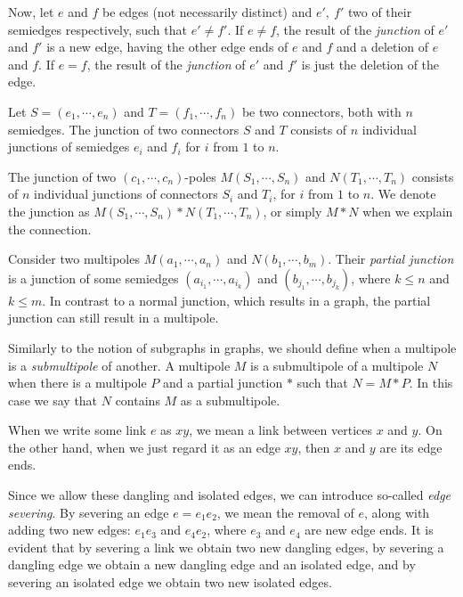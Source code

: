 \documentclass[12pt, twoside]{book}
\begin{document}
Now, let $e$ and $f$ be edges (not necessarily distinct) and $e',~f'$ two of their semiedges respectively, such that $e'\neq f'$. If $e\neq f$, the result of the \textit{junction} of $e'$ and $f'$ is a new edge, having the other edge ends of $e$ and $f$ and a deletion of $e$ and $f$. If $e=f$, the result of the \textit{junction} of $e'$ and $f'$ is just the deletion of the edge.

Let $S=(e_1,\cdots,e_n)$ and $T=(f_1,\cdots,f_n)$ be two connectors, both with $n$ semiedges. The junction of two connectors $S$ and $T$ consists of $n$ individual junctions of semiedges $e_i$ and $f_i$ for $i$ from $1$ to $n$.


The junction of two $(c_1,\cdots,c_n)$-poles $M(S_1,\cdots,S_n)$ and $N(T_1,\cdots,T_n)$ consists of $n$ individual junctions of connectors $S_i$ and $T_i$, for $i$ from $1$ to $n$. We denote the junction as $M(S_1,\cdots,S_n)*N(T_1,\cdots,T_n)$, or simply $M*N$ when we explain the connection. 

Consider two multipoles $M(a_1,\cdots,a_n)$ and $N(b_1,\cdots,b_m)$. Their \textit{partial junction} is a junction of some semiedges $(a_{i_1},\cdots, a_{i_k})$ and $(b_{j_1},\cdots, b_{j_k})$, where $k\leq n$ and $k\leq m$. In contrast to a normal junction, which results in a graph, the partial junction can still result in a multipole. 


Similarly to the notion of subgraphs in graphs, we should define when a multipole is a \textit{submultipole} of another. A multipole $M$ is a submultipole of a multipole $N$ when there is a multipole $P$ and a partial junction $*$ such that $N=M*P$. In this case we say that $N$ contains $M$ as a submultipole.


When we write some link $e$ as $xy$, we mean a link between vertices $x$ and $y$. On the other hand, when we just regard it as an edge $xy$, then $x$ and $y$ are its edge ends.

Since we allow these dangling and isolated edges, we can introduce so-called \textit{edge severing}. By severing an edge $e=e_1e_2$, we mean the removal of $e$, along with adding two new edges: $e_1e_3$ and $e_4e_2$, where $e_3$ and $e_4$ are new edge ends. It is evident that by severing a link we obtain two new dangling edges, by severing a dangling edge we obtain a new dangling edge and an isolated edge, and by severing an isolated edge we obtain two new isolated edges.
\end{document}

